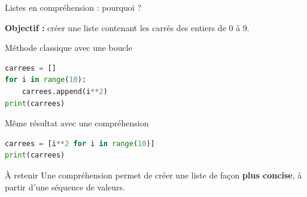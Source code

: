 \documentclass[10pt]{beamer}
\begin{document}
\begin{frame}[fragile]{Listes en compréhension : pourquoi ?}

\textbf{Objectif :} créer une liste contenant les carrés
des entiers de $0$ à $9$.

\begin{exampleblock}{Méthode classique avec une boucle}
\begin{lstlisting}[language=Python]
carrees = []
for i in range(10):
    carrees.append(i**2)
print(carrees)
\end{lstlisting}
\end{exampleblock}

\pause

\begin{exampleblock}{Même résultat avec une compréhension}
\begin{lstlisting}[language=Python]
carrees = [i**2 for i in range(10)]
print(carrees)
\end{lstlisting}
\end{exampleblock}

\begin{block}{À retenir}
Une compréhension permet de créer une liste de façon
\textbf{plus concise}, à partir d'une séquence de valeurs.
\end{block}

\end{frame}
\end{document}
